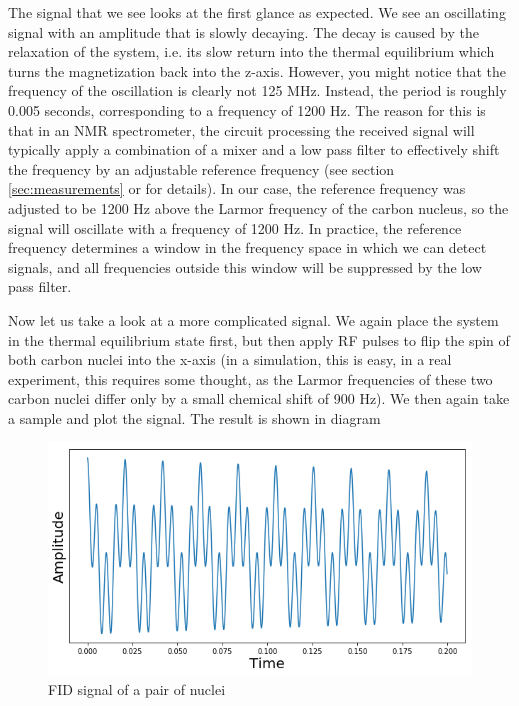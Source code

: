 \documentclass[a4paper, draft]{article}
\theoremstyle{own}
\theoremstyle{remark}
\begin{document}
The signal that we see looks at the first glance as expected. We see an oscillating signal with an amplitude that is slowly decaying. The decay is caused by the relaxation of the system, i.e. its slow return into the thermal equilibrium which turns the magnetization back into the z-axis. However, you might notice that the frequency of the oscillation is clearly not 125 MHz. Instead, the period is roughly 0.005 seconds, corresponding to a frequency of 1200 Hz. The reason for this is that in an NMR spectrometer, the circuit processing the received signal will typically apply a combination of a mixer and a low pass filter to effectively shift the frequency by an adjustable reference frequency (see section \ref{sec:measurements} or \cite{Levitt} for details). In our case, the reference frequency was adjusted to be 1200 Hz above the Larmor frequency of the carbon nucleus, so the signal will oscillate with a frequency of 1200 Hz. In practice, the reference frequency determines a window in the frequency space in which we can detect signals, and all frequencies outside this window will be suppressed by the low pass filter.

Now let us take a look at a more complicated signal. We again place the system in the thermal equilibrium state first, but then apply RF pulses to flip the spin of both carbon nuclei into the x-axis (in a simulation, this is easy, in a real experiment, this requires some thought, as the Larmor frequencies of these two carbon nuclei differ only by a small chemical shift of 900 Hz). We then again take a sample and plot the signal. The result is shown in diagram 

\begin{figure}[ht]
\centering
\includegraphics[width=0.9\linewidth]{images/TwoNucleiNMRSignal}
\caption[FID signal of a pair of nuclei]{FID signal of a pair of nuclei}
\label{fig:TwoNucleiNMRSignal}
\end{figure}
\end{document}
